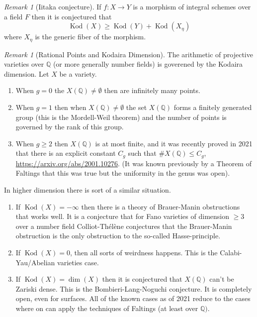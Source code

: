 \documentclass[12pt]{article}
\numberwithin{equation}{section}
\theoremstyle{definition}
\theoremstyle{remark}
\newtheorem{remark}[theorem]{Remark}
\newcommand{\QQ}{\mathbb{Q}}
\newcommand{\kod}{\operatorname{Kod}}
\begin{document}
\begin{remark}[Iitaka conjecture]
	If $f:X\to Y$ is a morphism of integral schemes over a field $F$ then it is conjectured that
	 $$ \kod(X) \geq \kod(Y) + \kod(X_{\eta}) $$
	where $X_{\eta}$ is the generic fiber of the morphism.
\end{remark}

\begin{remark}[Rational Points and Kodaira Dimension]
	The arithmetic of projective varieties over $\QQ$ (or more generally number fields) is goverened by the Kodaira dimension.
	Let $X$ be a variety.  
	\begin{enumerate}
		\item When $g=0$ the $X(\QQ)\neq \emptyset$ then are infinitely many points. 
		\item When $g=1$ then when $X(\QQ)\neq \emptyset$ the set $X(\QQ)$ forms a finitely generated group (this is the Mordell-Weil theorem) and the number of points is governed by the rank of this group. 
		\item When $g\geq 2$ then $X(\QQ)$ is at most finite, and it was recently proved in 2021 that there is an explicit constant $C_g$ such that $\#X(\QQ)\leq C_g$, \url{https://arxiv.org/abs/2001.10276}. (It was known previously by a Theorem of Faltings that this was true but the uniformity in the genus was open).
	\end{enumerate}
In higher dimension there is sort of a similar situation. 
\begin{enumerate}
	\item If $\kod(X)=-\infty$ then there is a theory of Brauer-Manin obstructions that works well. It is a conjecture that for Fano varieties of dimension $\geq 3$ over a number field Colliot-Th\'{e}l\`{e}ne conjectures that the Brauer-Manin obstruction is the only obstruction to the so-called Hasse-principle.
	\item If $\kod(X)=0$, then all sorts of weirdness happens. 
	This is the Calabi-Yau/Abelian varieties case. 
	\item If $\kod(X)=\dim(X)$ then it is conjectured that $X(\QQ)$ can't be Zariski dense. 
	This is the Bombieri-Lang-Noguchi conjecture. 
	It is completely open, even for surfaces. 
	All of the known cases as of 2021 reduce to the cases where on can apply the techniques of Faltings (at least over $\QQ)$. 
\end{enumerate}
\end{remark}
\end{document}
